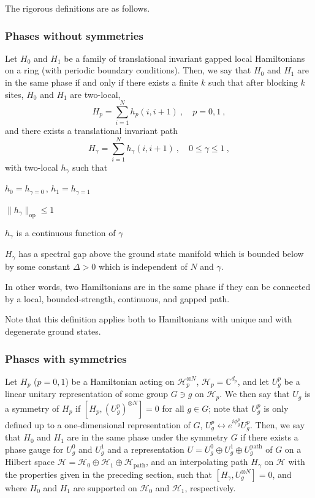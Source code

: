 \documentclass[twocolumn,superscriptaddress,prb,linenumbers]{revtex4-1}
\newcommand{\mc}[1]{\mathcal{#1}}
\newcommand{\sss}[1]{\subsubsection{#1}}
\newenvironment{packed_enum}{
\vspace{-6pt}\begin{enumerate}[i)]
  \setlength{\itemsep}{2pt}
  \setlength{\itemindent}{0pt}
  \setlength{\parskip}{0pt}
  }{\end{enumerate}
  \vspace{-4pt}}
\begin{document}
The rigorous definitions are as follows.

\sss{\label{sec:phases-definition-no-sym}
    Phases without symmetries}%

Let $H_0$ and $H_1$ be a family of translational invariant gapped local
Hamiltonians on a ring (with periodic boundary conditions).  Then, we say
that $H_0$ and $H_1$ are in the same phase if and only if there exists a
finite $k$ such that after blocking $k$ sites, $H_0$ and $H_1$ are
two-local,
\[
    H_p=\sum_{i=1}^{N} h_p(i,i+1)\ ,\quad p=0,1\ ,
\]
and there exists a translational invariant
path
\[
    H_\gamma = \sum_{i=1}^N h_\gamma(i,i+1)\ ,\quad 0\le \gamma\le 1\ ,
\]
with two-local $h_\gamma$ such that
\begin{packed_enum}
    \item $h_0=h_{\gamma=0}$\,, $h_1=h_{\gamma=1}$
    \item $\|h_\gamma\|_\mathrm{op}\le 1$
    \item $h_\gamma$ is a continuous function of $\gamma$
    \item $H_\gamma$ has a spectral gap above the ground
    state manifold which is bounded below by some constant
    $\Delta>0$ which is independent of $N$ and $\gamma$.
\end{packed_enum}
In other words, two Hamiltonians are in the same phase if they can be
connected by a local, bounded-strength, continuous, and gapped path.

Note that this definition applies both to Hamiltonians with unique and
with degenerate ground states.


\sss{Phases with symmetries
    \label{sec:def-sym-phases}}%


Let $H_p$ ($p=0,1$) be a Hamiltonian acting on $\mc H_p^{\otimes N}$, $\mc
    H_p=\mathbb C^{d_p}$, and let $U^p_g$ be a linear unitary representation of some
group $G\ni g$ on $\mc H_p$. We then say that $U_g$
is a symmetry of $H_p$ if $[H_p,(U_g^p)^{\otimes N}]=0$ for all $g\in G$;
note that $U_g^p$ is only defined up to a one-dimensional representation
of $G$, $U_g^p\leftrightarrow e^{i\phi_g^p} U_g^p$.
Then, we say that $H_0$ and $H_1$ are in the same phase under the symmetry
$G$ if there exists a phase gauge for $U_g^0$ and $U_g^1$ and a
representation $U=U^0_g\oplus U^1_g\oplus
    U^{\mathrm{path}}_g$ of $G$ on a Hilbert space $\mc H = \mc H_0\oplus \mc
    H_1 \oplus \mc H_{\mathrm{path}}$, and an interpolating
path $H_\gamma$ on $\mc H$ with the properties given in the preceding
section, such that $[H_\gamma,U_g^{\otimes N}]=0$, and where $H_0$ and
$H_1$ are supported on $\mc H_0$ and $\mc H_1$, respectively.
\end{document}
